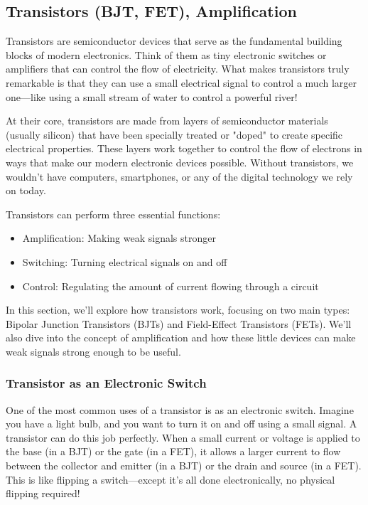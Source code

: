 \subsection{Transistors (BJT, FET), Amplification}
\label{subsec:transistors}

Transistors are semiconductor devices that serve as the fundamental building blocks of modern electronics. Think of them as tiny electronic switches or amplifiers that can control the flow of electricity. What makes transistors truly remarkable is that they can use a small electrical signal to control a much larger one—like using a small stream of water to control a powerful river!

At their core, transistors are made from layers of semiconductor materials (usually silicon) that have been specially treated or "doped" to create specific electrical properties. These layers work together to control the flow of electrons in ways that make our modern electronic devices possible. Without transistors, we wouldn't have computers, smartphones, or any of the digital technology we rely on today.

Transistors can perform three essential functions:
\begin{itemize}
    \item Amplification: Making weak signals stronger
    \item Switching: Turning electrical signals on and off
    \item Control: Regulating the amount of current flowing through a circuit
\end{itemize}

In this section, we'll explore how transistors work, focusing on two main types: Bipolar Junction Transistors (BJTs) and Field-Effect Transistors (FETs). We'll also dive into the concept of amplification and how these little devices can make weak signals strong enough to be useful.

\subsubsection*{Transistor as an Electronic Switch}
One of the most common uses of a transistor is as an electronic switch. Imagine you have a light bulb, and you want to turn it on and off using a small signal. A transistor can do this job perfectly. When a small current or voltage is applied to the base (in a BJT) or the gate (in a FET), it allows a larger current to flow between the collector and emitter (in a BJT) or the drain and source (in a FET). This is like flipping a switch—except it’s all done electronically, no physical flipping required!



